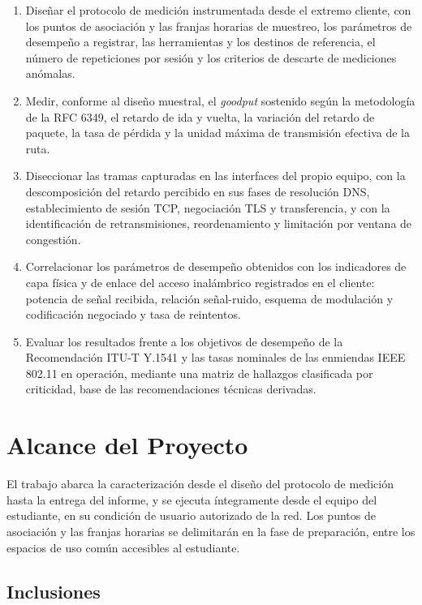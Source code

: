 \begin{enumerate}
  \item Diseñar el protocolo de medición instrumentada desde el extremo cliente, con los puntos de asociación y las franjas horarias de muestreo, los parámetros de desempeño a registrar, las herramientas y los destinos de referencia, el número de repeticiones por sesión y los criterios de descarte de mediciones anómalas.
  \item Medir, conforme al diseño muestral, el \textit{goodput} sostenido según la metodología de la RFC 6349, el retardo de ida y vuelta, la variación del retardo de paquete, la tasa de pérdida y la unidad máxima de transmisión efectiva de la ruta.
  \item Diseccionar las tramas capturadas en las interfaces del propio equipo, con la descomposición del retardo percibido en sus fases de resolución DNS, establecimiento de sesión TCP, negociación TLS y transferencia, y con la identificación de retransmisiones, reordenamiento y limitación por ventana de congestión.
  \item Correlacionar los parámetros de desempeño obtenidos con los indicadores de capa física y de enlace del acceso inalámbrico registrados en el cliente: potencia de señal recibida, relación señal-ruido, esquema de modulación y codificación negociado y tasa de reintentos.
  \item Evaluar los resultados frente a los objetivos de desempeño de la Recomendación ITU-T Y.1541 y las tasas nominales de las enmiendas IEEE 802.11 en operación, mediante una matriz de hallazgos clasificada por criticidad, base de las recomendaciones técnicas derivadas.
\end{enumerate}

\section{Alcance del Proyecto}

El trabajo abarca la caracterización desde el diseño del protocolo de medición hasta la entrega del informe, y se ejecuta íntegramente desde el equipo del estudiante, en su condición de usuario autorizado de la red. Los puntos de asociación y las franjas horarias se delimitarán en la fase de preparación, entre los espacios de uso común accesibles al estudiante.

\subsection*{Inclusiones}

